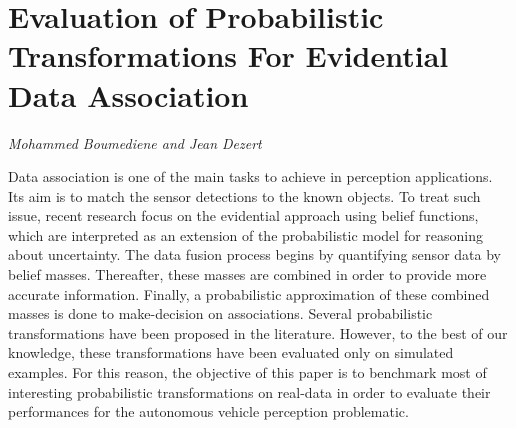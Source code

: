 \documentclass[../booklet.tex]{subfiles}
\begin{document}
\section[Evaluation of Probabilistic Transformations For Evidential Data Association. {\it Mohammed Boumediene and Jean Dezert}]{Evaluation of Probabilistic Transformations For Evidential Data Association}
 

\begin{center}
  {\it Mohammed Boumediene and Jean Dezert}
\end{center}

\vskip 0.8cm


Data association is one of the main tasks to achieve in perception applications. Its aim is to match the sensor detections to the known objects. To treat such issue, recent research focus on the evidential approach using belief functions, which are interpreted as an extension of the probabilistic model for reasoning about uncertainty. The data fusion process begins by quantifying sensor data by belief masses. Thereafter, these masses are combined in order to provide more accurate information. Finally, a probabilistic approximation of these combined masses is done to make-decision on associations. Several probabilistic transformations have been proposed in the literature. However, to the best of our knowledge, these transformations have been evaluated only on simulated examples. For this reason, the objective of this paper is to benchmark most of interesting probabilistic transformations on real-data in order to evaluate their performances for the autonomous vehicle perception problematic. 
\end{document}
